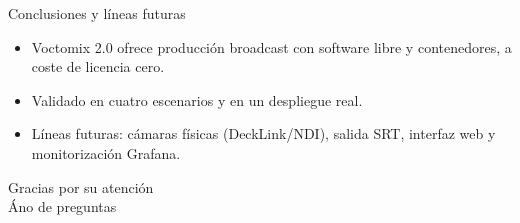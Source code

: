 \documentclass[aspectratio=169,10pt]{beamer}
\begin{document}
\begin{frame}{Conclusiones y l\'ineas futuras}
  \begin{itemize}
    \item Voctomix 2.0 ofrece producci\'on broadcast con software libre y
          contenedores, a coste de licencia cero.
    \item Validado en cuatro escenarios y en un despliegue real.
    \item \alert{L\'ineas futuras}: c\'amaras f\'isicas (DeckLink/NDI),
          salida SRT, interfaz web y monitorizaci\'on Grafana.
  \end{itemize}
\end{frame}

\begin{frame}[standout]
  Gracias por su atenci\'on\\[6pt]
  \small \textnormal{\'Ano de preguntas}
\end{frame}
\end{document}
